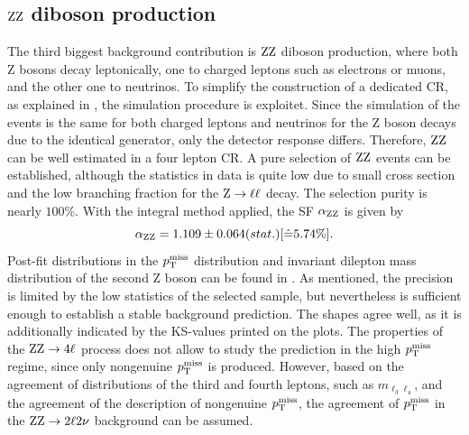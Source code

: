 \subsection{$\mathrm{Z}\mathrm{Z}$ diboson production}
The third biggest background contribution is $\mathrm{Z}\mathrm{Z}$ diboson production, where both Z bosons decay leptonically, one to charged leptons such as electrons or muons, and the other one to neutrinos. To simplify the construction of a dedicated CR, as explained in , the simulation procedure is exploitet. Since the simulation of the events is the same for both charged leptons and neutrinos for the Z boson decays due to the identical generator, only the detector response differs. Therefore, $\mathrm{Z}\mathrm{Z}$ can be well estimated in a four lepton CR. A pure selection of $\mathrm{Z}\mathrm{Z}$ events can be established, although the statistics in data is quite low due to small cross section and the low branching fraction for the $\mathrm{Z}\to\ell\ell$ decay. The selection purity is nearly $100\%$.
%
With the integral method applied, the SF $\alpha_{\mathrm{Z}\mathrm{Z}}$ is given by
\begin{equation}\label{eq:AlphaZZ}
 \alpha_{\mathrm{Z}\mathrm{Z}}=1.109 \pm 0.064 (stat.) [\hat{=}5.74\%].
\end{equation}
Post-fit distributions in the $p_{\mathrm{T}}^\text{miss}$ distribution and invariant dilepton mass distribution of the second Z boson can be found in . As mentioned, the precision is limited by the low statistics of the selected sample, but nevertheless is sufficient enough to establish a stable background prediction. The shapes agree well, as it is additionally indicated by the KS-values printed on the plots. The properties of the $\mathrm{Z}\mathrm{Z}\to4\ell$ process does not allow to study the prediction in the high $p_{\mathrm{T}}^\text{miss}$ regime, since only nongenuine $p_{\mathrm{T}}^\text{miss}$ is produced. However, based on the agreement of distributions of the third and fourth leptons, such as $m_{\ell_3\ell_4}$, and the agreement of the description of nongenuine $p_{\mathrm{T}}^\text{miss}$, the agreement of $p_{\mathrm{T}}^\text{miss}$ in the $\mathrm{Z}\mathrm{Z}\to2\ell2\nu$ background can be assumed.
